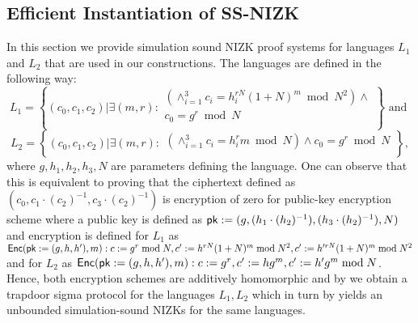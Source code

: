\subsection{Efficient Instantiation of SS-NIZK}\label{sec:nizk-crs}
In this section we provide simulation sound NIZK proof systems for languages $L_1$ and $L_2$ that are used in our constructions. The languages are defined in the following way:  
\[
L_1 = \left\{(c_0, c_1, c_2)| \exists (m,r):
\begin{aligned}
       (\land_{i=1}^3 c_i = h_i^{rN}(1+N)^m \bmod N^2) \land \\
       c_0 = g^r \bmod N\\
    \end{aligned}
    \right\} \text{ and } 
\]
\[
L_2 = \left\{(c_0, c_1, c_2)| \exists (m,r):
\begin{aligned}
       (\land_{i=1}^3 c_i = h_i^{r}m \bmod N) \land
       c_0 = g^r \bmod N\\
    \end{aligned}
    \right\},   
\]
where $g, h_1, h_2, h_3, N$ are parameters defining the language. One can observe that this is equivalent to proving that the ciphertext defined as $(c_0, c_1\cdot (c_2)^{-1}, c_3\cdot (c_2)^{-1})$ is encryption of zero for public-key encryption scheme where a public key is defined as $\mathsf{pk}:=(g, (h_1\cdot (h_2)^{-1}), (h_3\cdot (h_2)^{-1}), N)$ and encryption is defined for $L_1$ as $\mathsf{Enc}(\mathsf{pk}:=(g,h,h'),m): c:=g^r \bmod N, c':=h^{rN}(1+N)^m \bmod N^2, c':=h'^{rN}(1+N)^m \bmod N^2$ and for $L_2$ as $\mathsf{Enc}(\mathsf{pk}:=(g,h,h'),m): c:=g^r, c':=hg^m, c':=h'g^m \bmod N$. Hence, both encryption schemes are additively homomorphic and by  we obtain a trapdoor sigma protocol for the languages $L_1, L_2$ which in turn by  yields an unbounded simulation-sound NIZKs for the same languages.  








